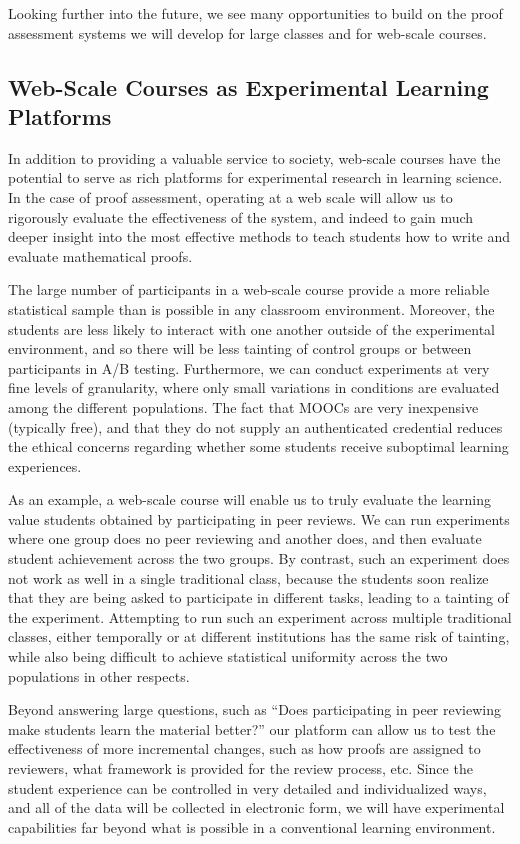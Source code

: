 \documentclass[12pt]{article}
\begin{document}
Looking further into the future, we see many opportunities to build on
the proof assessment systems we will develop for large classes and for
web-scale courses.

\subsection{Web-Scale Courses as Experimental Learning Platforms}

In addition to providing a valuable service to society, web-scale
courses have the potential to serve as rich platforms for experimental
research in learning science.  In the case of proof assessment,
operating at a web scale will allow us to rigorously evaluate the
effectiveness of the system, and indeed to gain much deeper insight
into the most effective methods to teach students how to write and
evaluate mathematical proofs.

The large number of participants in a web-scale course provide a more
reliable statistical sample than is possible in any classroom
environment.  Moreover, the students are less likely to interact with
one another outside of the experimental environment, and so there will
be less tainting of control groups or between participants in A/B
testing.  Furthermore, we can conduct experiments at very fine levels
of granularity, where only small variations in conditions are
evaluated among the different populations.  The fact that MOOCs are
very inexpensive (typically free), and that they do not supply an
authenticated credential reduces the ethical concerns regarding whether
some students receive suboptimal learning experiences.

As an example, a web-scale course will enable us to truly evaluate the
learning value students obtained by participating in peer reviews.  We
can run experiments where one group does no peer reviewing and another
does, and then evaluate student achievement across the two groups.  By
contrast, such an experiment does not work as well in a single
traditional class, because the students soon realize that they
are being asked to participate in different tasks, leading to a
tainting of the experiment.  Attempting to run such an experiment
across multiple traditional classes, either temporally or at different
institutions has the same risk of tainting, while also being difficult
to achieve statistical uniformity across the two populations in other
respects.

Beyond answering large questions, such as ``Does participating in peer
reviewing make students learn the material better?'' our platform can
allow us to test the effectiveness of more incremental changes, such
as how proofs are assigned to reviewers, what framework is provided
for the review process, etc.  Since the student experience can be
controlled in very detailed and individualized ways, and all of the
data will be collected in electronic form, we will have experimental
capabilities far beyond what is possible in a conventional learning
environment.
\end{document}
